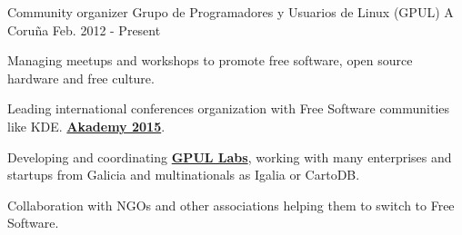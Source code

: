 


\begin{cventries}


\cventry
{Community organizer} %
{Grupo de Programadores y Usuarios de Linux (GPUL)} %
{A Coruña} %
{Feb. 2012 - Present} %
{ %
\begin{cvitems}
\item {Managing meetups and workshops to promote free software, open 
source hardware and free culture.}
\item {Leading international conferences organization with Free Software 
communities like KDE. \textbf{\href{https://akademy.kde.org/2015}{Akademy 
2015}}.}
\item {Developing and coordinating 
\textbf{\href{http://labs.gpul.org/}{GPUL Labs}}, working with many enterprises 
and startups from Galicia and multinationals as Igalia or CartoDB.}
\item {Collaboration with NGOs and other associations helping them to switch to
Free Software.}
\end{cvitems}
}



\end{cventries}
